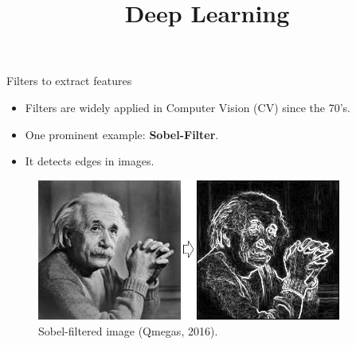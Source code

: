 




\newcommand{\titlefigure}{figure/conv2d_main_photo.png}%
\newcommand{\learninggoals}{
  \item What are filters? 
  \item Convolutional Operation
  \item 2D Convolution
}

\title{Deep Learning}
\date{}




\begin{vbframe}{Filters to extract features}
    \begin{itemize}
        \item Filters are widely applied in Computer Vision (CV) since the 70's.
        \item One prominent example: \textbf{Sobel-Filter}.
        \item It detects edges in images.
    \end{itemize}
    \begin{figure}
        \centering
        \includegraphics[width=10cm]{figure/sobel_einstein.png}
        \caption{Sobel-filtered image (Qmegas, 2016).}
    \end{figure}
\framebreak


\end{vbframe}
